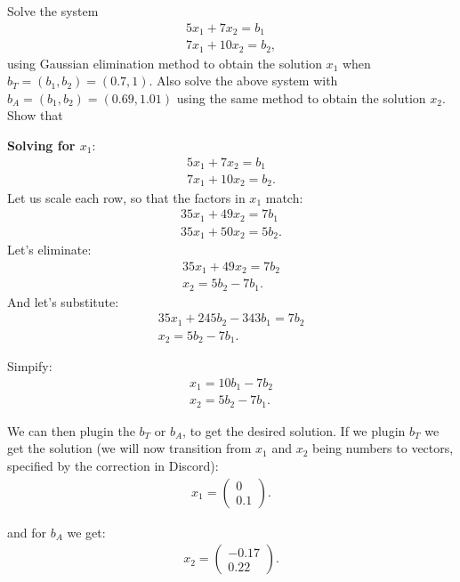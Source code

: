 \documentclass[10pt]{article}
\begin{document}
\begin{exercise}[4]  \label{exe:4}
Solve the system
\begin{align*}
5x_1 + 7x_2 = b_1 \\
7x_1 + 10x_2 = b_2
,
\end{align*}
using Gaussian elimination method to obtain the solution \(x_1\)
when \(b _{T} = (b_1, b_2) = (0.7, 1)\). Also solve the above system
with \(b_A = (b_1, b_2) = (0.69, 1.01)\) using the same method to
obtain the solution \(x_2\). Show that
\end{exercise}
\begin{solution}[4]  \label{sol:4}
\textbf{Solving for \(x_1\)}:
\begin{align*}
5x_1 + 7x_2 = b_1 \\
7x_1 + 10x_2 = b_2
.
\end{align*}
Let us scale each row, so that the factors in \(x_1\) match:
\begin{align*}
35x_1 + 49x_2 = 7b_1 \\
35x_1 + 50x_2 = 5b_2
.
\end{align*}
Let's eliminate:
\begin{align*}
35x_1 + 49x_2 = 7b_2 \\
 x_2 = 5b_2 - 7b_1
.
\end{align*}
And let's substitute:
\begin{align*}
35x_1 + 245 b_2 - 343 b_1 = 7 b_2 \\
x_2 = 5b_2 - 7b_1
.
\end{align*}

Simpify:
\begin{align*}
x_1 = 10 b_1 - 7 b_2 \\
x_2 = 5b_2 - 7b_1
.
\end{align*}

We can then plugin the \(b_T\) or \(b_A\), to get the desired solution.
If we plugin \(b_T\) we get the solution (we will now transition from \(x_1\) and
\(x_2\) being numbers to vectors, specified by the correction in Discord):
\begin{align*}
x_1 =
\left( \begin{array}{c}
0 \\
0.1
\end{array} \right)
.
\end{align*}

and for \(b_A\) we get:
\begin{align*}
x_2 =
\left( \begin{array}{}
-0.17 \\
0.22
\end{array} \right)
.
\end{align*}


\end{solution}
\end{document}
